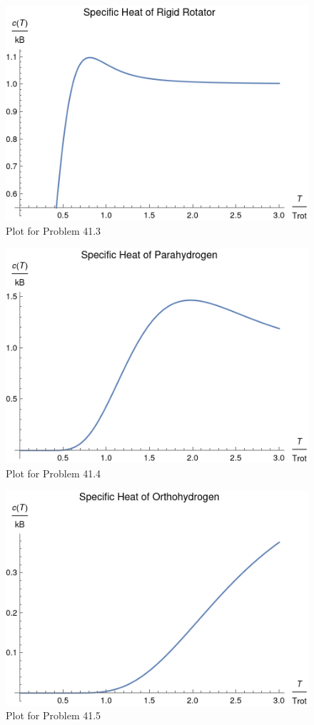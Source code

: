 \documentclass[a4paper,twoside]{article}
\begin{document}
\begin{figure}[h]
    \centering
    \includegraphics[width=\textwidth]{41_3.png}
    \caption{Plot for Problem 41.3}
    \label{fig:41_3}
\end{figure}
\begin{figure}[h]
    \centering
    \includegraphics[width=\textwidth]{41_4.png}
    \caption{Plot for Problem 41.4}
    \label{fig:41_4}
\end{figure}
\begin{figure}[h]
    \centering
    \includegraphics[width=\textwidth]{41_5.png}
    \caption{Plot for Problem 41.5}
    \label{fig:41_5}
\end{figure}
\end{document}
